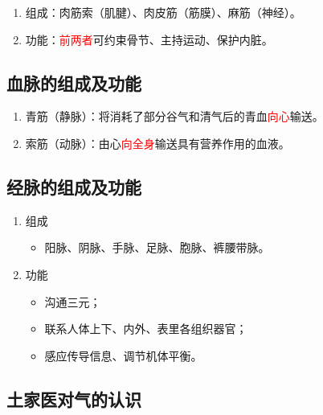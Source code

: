\documentclass[cn,hazy,blue,12pt,normal,founder]{elegantnote}
\newcommand{\redt}[1]{\textcolor{red}{{}#1}}      %
\begin{document}
\begin{enumerate}
  \item 组成：肉筋索（肌腱）、肉皮筋（筋膜）、麻筋（神经）。
  \item 功能：\redt{前两者}可约束骨节、主持运动、保护内脏。
\end{enumerate}

\subsection{血脉的组成及功能}

\begin{enumerate}
  \item 青筋（静脉）：将消耗了部分谷气和清气后的青血\redt{向心}输送。
  \item 索筋（动脉）：由心\redt{向全身}输送具有营养作用的血液。
\end{enumerate}

\subsection{经脉的组成及功能}

\begin{enumerate}
  \item 组成
  \begin{itemize}
    \item 阳脉、阴脉、手脉、足脉、胞脉、裤腰带脉。
  \end{itemize}
  \item 功能
  \begin{itemize}
    \item 沟通三元；
    \item 联系人体上下、内外、表里各组织器官；
    \item 感应传导信息、调节机体平衡。
  \end{itemize}
\end{enumerate}

\subsection{土家医对气的认识}
\end{document}
